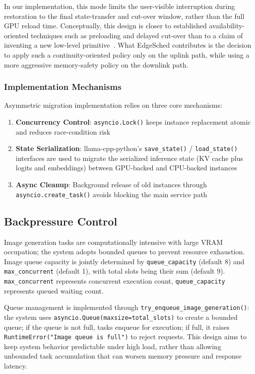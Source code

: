 In our implementation, this mode limits the user-visible interruption during restoration to the final state-transfer and cut-over window, rather than the full GPU reload time. Conceptually, this design is closer to established availability-oriented techniques such as preloading and delayed cut-over than to a claim of inventing a new low-level primitive~\cite{cully2008remus}. What EdgeSched contributes is the decision to apply such a continuity-oriented policy only on the uplink path, while using a more aggressive memory-safety policy on the downlink path.

\subsubsection{Implementation Mechanisms}

Asymmetric migration implementation relies on three core mechanisms:
\begin{enumerate}
\item \textbf{Concurrency Control}: \texttt{asyncio.Lock()} keeps instance replacement atomic and reduces race-condition risk
\item \textbf{State Serialization}: llama-cpp-python's \texttt{save\_state()} / \texttt{load\_state()} interfaces are used to migrate the serialized inference state (KV cache plus logits and embeddings) between GPU-backed and CPU-backed instances
\item \textbf{Async Cleanup}: Background release of old instances through \texttt{asyncio.create\_task()} avoids blocking the main service path
\end{enumerate}

\subsection{Backpressure Control}

Image generation tasks are computationally intensive with large VRAM occupation; the system adopts bounded queues to prevent resource exhaustion. Image queue capacity is jointly determined by \texttt{queue\_capacity} (default 8) and \texttt{max\_concurrent} (default 1), with total slots being their sum (default 9). \texttt{max\_concurrent} represents concurrent execution count, \texttt{queue\_capacity} represents queued waiting count.

Queue management is implemented through \texttt{try\_enqueue\_image\_generation()}: the system uses \texttt{asyncio.Queue(maxsize=total\_slots)} to create a bounded queue; if the queue is not full, tasks enqueue for execution; if full, it raises \texttt{RuntimeError("Image queue is full")} to reject requests. This design aims to keep system behavior predictable under high load, rather than allowing unbounded task accumulation that can worsen memory pressure and response latency.


